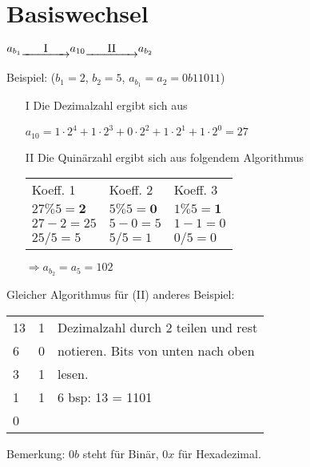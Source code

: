 \section{Basiswechsel}
\begin{center}
	$a_{b_1} \underrightarrow{\text{\qquad I\qquad}} a_{10} \underrightarrow{\text{\qquad II\qquad}} a_{b_2}$
\end{center}
Beispiel: ($b_1 = 2$, $b_2 = 5$, $a_{b_1} = a_2 = 0b11011$)
\begin{itemize}
	\item[I] Die Dezimalzahl ergibt sich aus
	\item[] $a_{10} = 1\cdot2^4 + 1\cdot2^3 + 0\cdot2^2 + 1\cdot2^1 + 1\cdot2^0 = 27$ 
	\item[II] Die Quinärzahl ergibt sich aus folgendem Algorithmus
	\begin{center}
		\begin{tabular}{lll}
		Koeff. 1 & Koeff. 2 & Koeff. 3\\
		$27 \% 5 = \textbf{2}$ & $5\%5 = \textbf{0}$ & $1\%5 = \textbf{1}$ \\
		$27 - 2 = 25$ & $5 - 0 = 5$ & $1 -1 = 0 $\\
		$25/5 = 5$ & $5/5 = 1$ & $0/5 = 0$ \\
	\end{tabular}
	\end{center}
$\Rightarrow a_{b_2} = a_5 = 1 0 2$
\end{itemize}
Gleicher Algorithmus für (II) anderes Beispiel:
\begin{center}
	\begin{tabular}{ lll } 
	13	&	1	& Dezimalzahl durch 2 teilen und rest\\
	6	& 	0	& notieren. Bits von unten nach oben\\
	3	&	1	& lesen.\\
	1	&	1	&6 bsp: 13 = 1101\\
	0 & & \\
	\end{tabular}
Bemerkung: $0b$ steht für Binär, $0x$ für Hexadezimal.
\end{center}
























